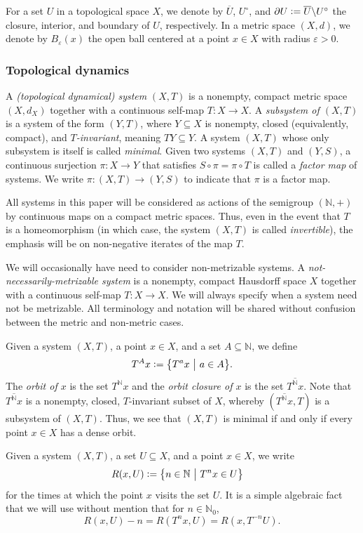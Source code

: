 \documentclass[letter,11pt]{article}
\theoremstyle{plain}
\theoremstyle{definition}
\theoremstyle{plain}
\theoremstyle{plain}
\numberwithin{equation}{section}
\newcommand{\eps}{\epsilon}
\newcommand{\N}{\mathbb{N}}
\newcommand{\defeq}{\vcentcolon=}
\renewcommand{\epsilon}{\varepsilon}
\renewcommand{\setminus}{\backslash}
\begin{document}
For a set $U$ in a topological space $X$, we denote by $\overline U$, $U^\circ$, and $\partial U \defeq \overline{U} \setminus U^\circ$ the closure, interior, and boundary of $U$, respectively.  In a metric space $(X,d)$, we denote by $B_\eps(x)$ the open ball centered at a point $x \in X$ with radius $\eps > 0$.

\subsubsection{Topological dynamics}
\label{sec_top_dynamics}

A \emph{(topological dynamical) system} $(X,T)$ is a nonempty, compact metric space $(X,d_X)$ together with a continuous self-map $T: X \to X$.  A \emph{subsystem of $(X,T)$} is a system of the form $(Y,T)$, where $Y \subseteq X$ is nonempty, closed (equivalently, compact), and \emph{$T$-invariant}, meaning $TY \subseteq Y$.  A system $(X,T)$ whose only subsystem is itself is called \emph{minimal}.  Given two systems $(X,T)$ and $(Y,S)$, a continuous surjection $\pi: X \to Y$ that satisfies $S \circ \pi = \pi \circ T$ is called a \emph{factor map} of systems.  We write $\pi: (X,T) \to (Y,S)$ to indicate that $\pi$ is a factor map.

All systems in this paper will be considered as actions of the semigroup $(\N, +)$ by continuous maps on a compact metric spaces.  Thus, even in the event that $T$ is a homeomorphism (in which case, the system $(X,T)$ is called \emph{invertible}), the emphasis will be on non-negative iterates of the map $T$.

We will occasionally have need to consider non-metrizable systems.  A \emph{not-necessarily-metrizable system} is a nonempty, compact Hausdorff space $X$ together with a continuous self-map $T: X \to X$.  We will always specify when a system need not be metrizable.  All terminology and notation will be shared without confusion between the metric and non-metric cases.

Given a system $(X,T)$, a point $x \in X$, and a set $A \subseteq \N$, we define
\[T^A x \defeq \big\{ T^a x \ \big| \ a \in A \big\}.\]
The \emph{orbit of $x$} is the set $T^{\N} x$ and the \emph{orbit closure of $x$} is the set $\overline{T^{\N}x}$. Note that $\overline{T^{\N}x}$ is a nonempty, closed, $T$-invariant subset of $X$, whereby $(\overline{T^{\N}x}, T)$ is a subsystem of $(X,T)$.  Thus, we see that $(X,T)$ is minimal if and only if every point $x \in X$ has a dense orbit.


Given a system $(X,T)$, a set $U \subseteq X$, and a point $x \in X$, we write
\begin{align*}
    R(x, U) &\defeq \big\{n \in \N \ \big | \ T^n x \in U \big\}
\end{align*}
for the times at which the point $x$ visits the set $U$. It is a simple algebraic fact that we will use without mention that for $n \in \N_0$,
\[R(x,U) - n = R(T^n x, U) = R(x, T^{-n}U).\]
\end{document}
